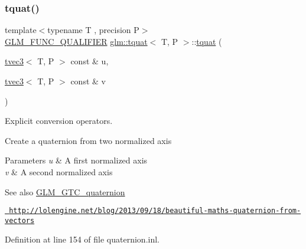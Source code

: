 \mbox{\label{structglm_1_1tquat_a5c680cd9a6e7de9e5b0fc2e9e096e6a7}} 
\subsubsection{\texorpdfstring{tquat()}{tquat()}\hspace{0.1cm}{\footnotesize\ttfamily [8/13]}}
{\footnotesize\ttfamily template$<$typename T , precision P$>$ \\
\mbox{\hyperlink{setup_8hpp_a33fdea6f91c5f834105f7415e2a64407}{G\+L\+M\+\_\+\+F\+U\+N\+C\+\_\+\+Q\+U\+A\+L\+I\+F\+I\+ER}} \mbox{\hyperlink{structglm_1_1tquat}{glm\+::tquat}}$<$ T, P $>$\+::\mbox{\hyperlink{structglm_1_1tquat}{tquat}} (\begin{DoxyParamCaption}\item[{\mbox{\hyperlink{structglm_1_1tvec3}{tvec3}}$<$ T, P $>$ const \&}]{u,  }\item[{\mbox{\hyperlink{structglm_1_1tvec3}{tvec3}}$<$ T, P $>$ const \&}]{v }\end{DoxyParamCaption})}



Explicit conversion operators. 

Create a quaternion from two normalized axis


\begin{DoxyParams}{Parameters}
{\em u} & A first normalized axis \\
\hline
{\em v} & A second normalized axis \\
\hline
\end{DoxyParams}
\begin{DoxySeeAlso}{See also}
\mbox{\hyperlink{group__gtc__quaternion}{G\+L\+M\+\_\+\+G\+T\+C\+\_\+quaternion}} 

\href{http://lolengine.net/blog/2013/09/18/beautiful-maths-quaternion-from-vectors}{\texttt{ http\+://lolengine.\+net/blog/2013/09/18/beautiful-\/maths-\/quaternion-\/from-\/vectors}} 
\end{DoxySeeAlso}


Definition at line 154 of file quaternion.\+inl.

\mbox{\label{structglm_1_1tquat_a9841cfe16ccfb909c4c2cd0956f2d42b}} 
